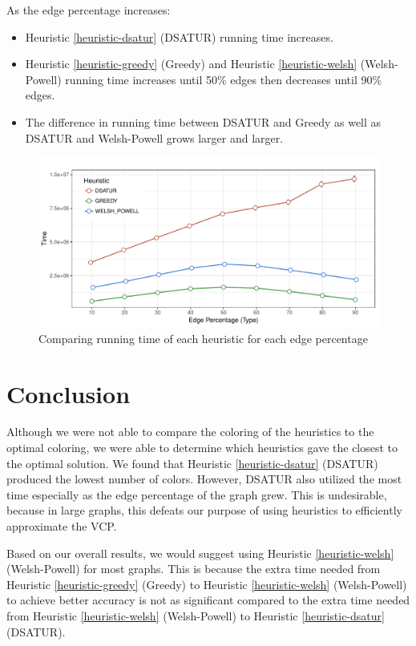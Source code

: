 \documentclass{article}
\newcounter{heuristic} \setcounter{heuristic}{0}
\theoremstyle{definition}
\begin{document}
\newpage

As the edge percentage increases:
\begin{itemize}
  \item Heuristic \ref{heuristic-dsatur} (DSATUR) running time increases.
  \item Heuristic \ref{heuristic-greedy} (Greedy) and Heuristic \ref{heuristic-welsh} (Welsh-Powell) running time increases until 50\% edges then decreases until 90\% edges.
  \item The difference in running time between DSATUR and Greedy as well as DSATUR and Welsh-Powell grows larger and larger.
\end{itemize}

\begin{figure}[H]
  \includegraphics[width=\linewidth]{../poster/figures/plot-time.pdf}
  \caption{Comparing running time of each heuristic for each edge percentage}\label{fig:compare-time}
\end{figure}

\section{Conclusion}
Although we were not able to compare the coloring of the heuristics to the optimal coloring, we were able to determine which heuristics gave the closest to the optimal solution. We found that Heuristic \ref{heuristic-dsatur} (DSATUR) produced the lowest number of colors. However, DSATUR also utilized the most time especially as the edge percentage of the graph grew. This is undesirable, because in large graphs, this defeats our purpose of using heuristics to efficiently approximate the VCP.

Based on our overall results, we would suggest using Heuristic \ref{heuristic-welsh} (Welsh-Powell) for most graphs. This is because the extra time needed from Heuristic \ref{heuristic-greedy} (Greedy) to Heuristic \ref{heuristic-welsh} (Welsh-Powell) to achieve better accuracy is not as significant compared to the extra time needed from Heuristic \ref{heuristic-welsh} (Welsh-Powell) to  Heuristic \ref{heuristic-dsatur} (DSATUR).



\newpage


\end{document}
